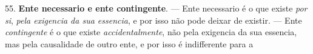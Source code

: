  55. \textbf{Ente necessario e ente contingente}. --- Ente necessario é o que existe \emph{por si}, \emph{pela exigencia da sua essencia}, e por isso não pode deixar de existir. --- Ente \emph{contingente} é o que existe \emph{accidentalmente}, não pela exigencia da sua essencia, mas pela causalidade de outro ente, e por isso é indifferente para a